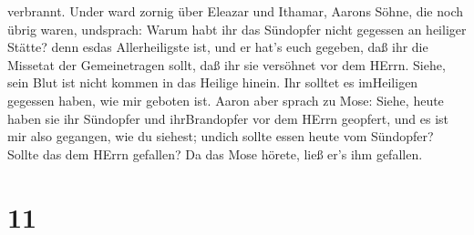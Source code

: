verbrannt. Under ward zornig über Eleazar und Ithamar, Aarons Söhne, die
noch übrig waren, undsprach:  Warum habt ihr das Sündopfer
nicht gegessen an heiliger Stätte? denn esdas Allerheiligste ist, und er
hat's euch gegeben, daß ihr die Missetat der Gemeinetragen sollt, daß
ihr sie versöhnet vor dem HErrn.  Siehe, sein Blut ist
nicht kommen in das Heilige hinein. Ihr solltet es imHeiligen gegessen
haben, wie mir geboten ist.  Aaron aber sprach zu Mose:
Siehe, heute haben sie ihr Sündopfer und ihrBrandopfer vor dem HErrn
geopfert, und es ist mir also gegangen, wie du siehest; undich sollte
essen heute vom Sündopfer? Sollte das dem HErrn gefallen? 
Da das Mose hörete, ließ er's ihm gefallen.

\hypertarget{section-10}{%
\section{11}\label{section-10}}


